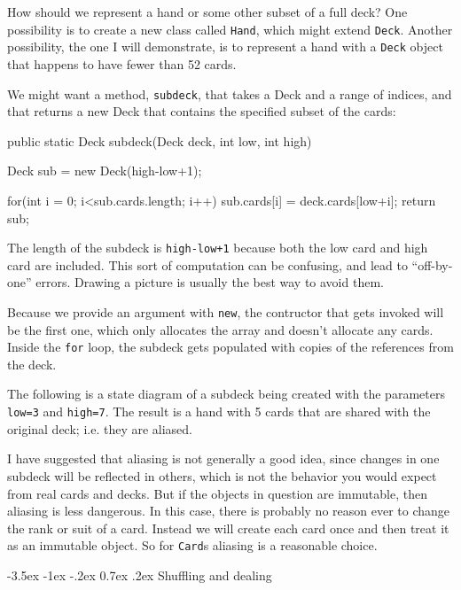 \documentclass{book}
\makeatletter
\renewcommand{\section}{\@startsection 
    {section} {1} {0mm}%
    {-3.5ex \@plus -1ex \@minus -.2ex}%
    {0.7ex \@plus.2ex}%
    {\normalfont\Large\bfseries}}
\makeatother
\begin{document}
How should we represent a hand or some other subset of a full deck?
One possibility is to create a new class called {\tt Hand}, which
might extend {\tt Deck}.  Another possibility, the one I will
demonstrate, is to represent a hand with a {\tt Deck} object that
happens to have fewer than 52 cards.

We might want a method, {\tt subdeck}, that takes a Deck
and a range of indices, and that returns a new Deck that
contains the specified subset of the cards:

\begin{verbatimtab}
public static Deck subdeck(Deck deck, int low, int high) {
    Deck sub = new Deck(high-low+1);
	
    for(int i = 0; i<sub.cards.length; i++) {
        sub.cards[i] = deck.cards[low+i];
    }
    return sub;
}
\end{verbatimtab}

The length of the subdeck is {\tt high-low+1} because both the low
card and high card are included.  This sort of computation can be
confusing, and lead to ``off-by-one'' errors.  Drawing a picture is
usually the best way to avoid them.


Because we provide an argument with {\tt new}, the
contructor that gets invoked will be the first one, which only
allocates the array and doesn't allocate any cards.  Inside the
{\tt for} loop, the subdeck gets populated with copies of the
references from the deck.

The following is a state diagram of a subdeck being created with the
parameters {\tt low=3} and {\tt high=7}.  The result is a hand with 5
cards that are shared with the original deck; i.e. they are aliased.



I have suggested that aliasing is not generally a good idea, since
changes in one subdeck will be reflected in others, which is not the
behavior you would expect from real cards and decks.  But if the
objects in question are immutable, then aliasing is less dangerous.
In this case, there is probably no reason ever to change the
rank or suit of a card.  Instead we will create each card
once and then treat it as an immutable object.  So for {\tt Card}s
aliasing is a reasonable choice.


\section{Shuffling and dealing}
\end{document}
